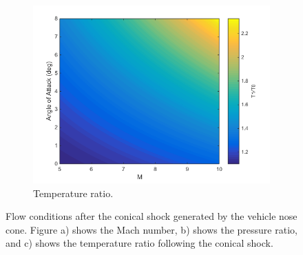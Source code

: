 \begin{figure}
\begin{subfigure}{.5\textwidth}
\includegraphics[width=0.99\linewidth]{figures/3_vehicle_design/ConicalT}
\caption{Temperature ratio.}
\label{fig:ConicalT}
\end{subfigure}
\caption{Flow conditions after the conical shock generated by the vehicle nose cone. Figure a) shows the Mach number, b) shows the pressure ratio, and c) shows the temperature ratio following the conical shock.}
\label{fig:ConicalShock}
\end{figure}

